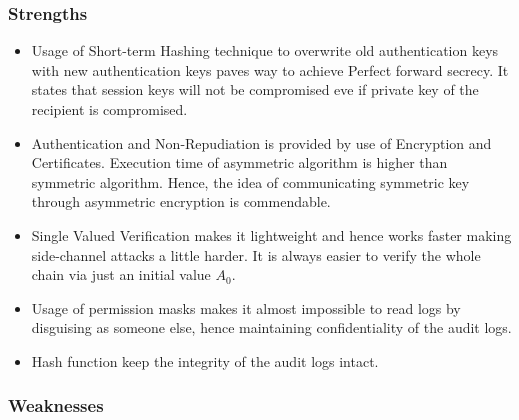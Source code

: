 \documentclass[12pt, letter]{article}
\begin{document}
\subsubsection{Strengths}

\begin{itemize}
    \item Usage of Short-term Hashing technique to overwrite old authentication keys with new authentication keys paves way to achieve Perfect forward secrecy. It states that session keys will not be compromised eve if private key of the recipient is compromised. 
    
    \item Authentication and Non-Repudiation is provided by use of Encryption and Certificates. Execution time of asymmetric algorithm is higher than symmetric algorithm. Hence, the idea of communicating symmetric key through asymmetric encryption is commendable.
    
    \item Single Valued Verification makes it lightweight and hence works faster making side-channel attacks a little harder. It is always easier to verify the whole chain via just an initial value $A_0$.
    
    \item Usage of permission masks makes it almost impossible to read logs by disguising as someone else, hence maintaining confidentiality of the audit logs.
    
    \item Hash function keep the integrity of the audit logs intact.
\end{itemize}


\subsubsection{Weaknesses}
\end{document}

